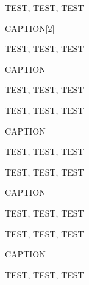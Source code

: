 \begin{ascolorbox11}{}

TEST, TEST, TEST

\end{ascolorbox11}

\begin{ascolorbox11}{CAPTION}[2]

TEST, TEST, TEST

\end{ascolorbox11}

\begin{ascolorbox12}{CAPTION}

TEST, TEST, TEST

\end{ascolorbox12}

\begin{ascolorbox12}{}

TEST, TEST, TEST

\end{ascolorbox12}

\begin{ascolorbox13}{CAPTION}

TEST, TEST, TEST

\end{ascolorbox13}

\begin{ascolorbox13}{}

TEST, TEST, TEST

\end{ascolorbox13}

\begin{ascolorbox14}{CAPTION}

TEST, TEST, TEST

\end{ascolorbox14}

\begin{ascolorbox14}{}

TEST, TEST, TEST

\end{ascolorbox14}

\begin{ascolorbox15}{CAPTION}

TEST, TEST, TEST

\end{ascolorbox15}

